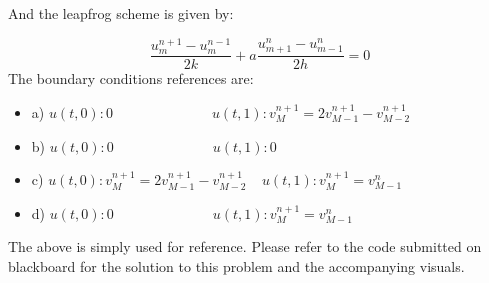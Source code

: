 \documentclass[12pt]{article}
\begin{document}
And the leapfrog scheme is given by:

$$
\frac{u_{m}^{n+1}-u_{m}^{n-1}}{2 k}+a \frac{u_{m+1}^{n}-u_{m-1}^{n}}{2 h}=0
$$
The boundary conditions references are:
 \begin{itemize}
    \item a) $u(t,0) : 0 ~~~~~~~~~~~~~~~~~~~~~~~~~~~~~~~~ u(t,1) : v_{M}^{n+1} = 2v_{M-1}^{n+1}-v_{M-2}^{n+1}$
    \item b) $u(t,0) : 0 ~~~~~~~~~~~~~~~~~~~~~~~~~~~~~~~~ u(t,1) : 0$
    \item c) $u(t,0) : v_{M}^{n+1}=2 v_{M-1}^{n+1}-v_{M-2}^{n+1} ~~~~~ u(t,1) : v_{M}^{n+1}=v_{M-1}^{n}$
    \item d) $u(t,0) : 0 ~~~~~~~~~~~~~~~~~~~~~~~~~~~~~~~~ u(t,1) : v_{M}^{n+1}=v_{M-1}^{n}$
\end{itemize}

The above is simply used for reference. Please refer to the code submitted on blackboard for the solution to this problem and the accompanying visuals.
\end{document}
